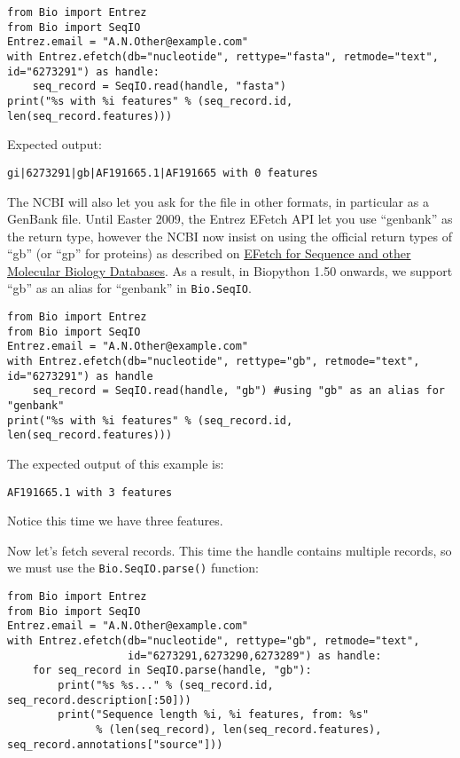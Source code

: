 \begin{verbatim}
from Bio import Entrez
from Bio import SeqIO
Entrez.email = "A.N.Other@example.com"
with Entrez.efetch(db="nucleotide", rettype="fasta", retmode="text", id="6273291") as handle:
    seq_record = SeqIO.read(handle, "fasta")
print("%s with %i features" % (seq_record.id, len(seq_record.features)))
\end{verbatim}

\noindent Expected output:

\begin{verbatim}
gi|6273291|gb|AF191665.1|AF191665 with 0 features
\end{verbatim}

The NCBI will also let you ask for the file in other formats, in particular as
a GenBank file. Until Easter 2009, the Entrez EFetch API let you use ``genbank''
as the return type, however the NCBI now insist on using the official
return types of ``gb'' (or ``gp'' for proteins) as described on
\href{https://www.ncbi.nlm.nih.gov/books/NBK3837/}
{EFetch for Sequence and other Molecular Biology Databases}.
As a result, in Biopython 1.50 onwards, we support ``gb'' as an
alias for ``genbank'' in \verb|Bio.SeqIO|.

\begin{verbatim}
from Bio import Entrez
from Bio import SeqIO
Entrez.email = "A.N.Other@example.com"
with Entrez.efetch(db="nucleotide", rettype="gb", retmode="text", id="6273291") as handle
    seq_record = SeqIO.read(handle, "gb") #using "gb" as an alias for "genbank"
print("%s with %i features" % (seq_record.id, len(seq_record.features)))
\end{verbatim}

\noindent The expected output of this example is:

\begin{verbatim}
AF191665.1 with 3 features
\end{verbatim}

\noindent Notice this time we have three features.

Now let's fetch several records.  This time the handle contains multiple records,
so we must use the \verb|Bio.SeqIO.parse()| function:

\begin{verbatim}
from Bio import Entrez
from Bio import SeqIO
Entrez.email = "A.N.Other@example.com"
with Entrez.efetch(db="nucleotide", rettype="gb", retmode="text",
                   id="6273291,6273290,6273289") as handle:
    for seq_record in SeqIO.parse(handle, "gb"):
        print("%s %s..." % (seq_record.id, seq_record.description[:50]))
        print("Sequence length %i, %i features, from: %s"
              % (len(seq_record), len(seq_record.features), seq_record.annotations["source"]))
\end{verbatim}

